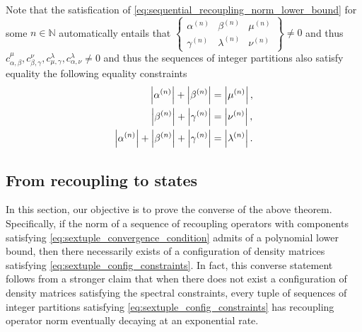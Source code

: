 \documentclass[notitlepage]{article}
\begin{document}
\begin{rem}
    Note that the satisfication of \cref{eq:sequential_recoupling_norm_lower_bound} for some $n \in \mathbb N$ automatically entails that $\begin{Bmatrix} \alpha^{(n)} & \beta^{(n)} & \mu^{(n)} \\ \gamma^{(n)} & \lambda^{(n)} & \nu^{(n)} \end{Bmatrix} \neq 0$ and thus $c_{\alpha,\beta}^{\mu}, c_{\beta,\gamma}^{\nu}, c_{\mu,\gamma}^{\lambda}, c_{\alpha,\nu}^{\lambda} \neq 0$ and thus the sequences of integer partitions also satisfy equality the following equality constraints
    \begin{align}
        \left|\alpha^{(n)}\right| + \left|\beta^{(n)}\right| &= \left|\mu^{(n)}\right|, \\
        \left|\beta^{(n)}\right| + \left|\gamma^{(n)}\right| &= \left|\nu^{(n)}\right|, \\
        \left|\alpha^{(n)}\right| + \left|\beta^{(n)}\right| + \left|\gamma^{(n)}\right| &= \left|\lambda^{(n)}\right|.
    \end{align}
\end{rem}

\subsection{From recoupling to states}

In this section, our objective is to prove the converse of the above theorem.
Specifically, if the norm of a sequence of recoupling operators with components satisfying \cref{eq:sextuple_convergence_condition} admits of a polynomial lower bound, then there necessarily exists of a configuration of density matrices satisfying \cref{eq:sextuple_config_constraints}.
In fact, this converse statement follows from a stronger claim that when there does not exist a configuration of density matrices satisfying the spectral constraints, every tuple of sequences of integer partitions satisfying \cref{eq:sextuple_config_constraints} has recoupling operator norm eventually decaying at an exponential rate.
\end{document}
